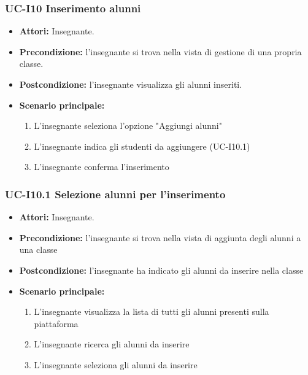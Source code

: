 \subsubsection{UC-I10 Inserimento alunni}
\begin{itemize}
	\item \textbf{Attori:} Insegnante.
	\item \textbf{Precondizione:} l'insegnante si trova nella vista di gestione di una propria classe.
	\item \textbf{Postcondizione:} l'insegnante visualizza gli alunni inseriti.
	\item \textbf{Scenario principale:}
	\begin{enumerate}
		\item L'insegnante seleziona l'opzione "Aggiungi alunni"
		\item L'insegnante indica gli studenti da aggiungere (UC-I10.1)
		\item L'insegnante conferma l'inserimento
	\end{enumerate}
\end{itemize}

\subsubsection{UC-I10.1 Selezione alunni per l'inserimento}
\begin{itemize}
	\item \textbf{Attori:} Insegnante.
	\item \textbf{Precondizione:} l'insegnante si trova nella vista di aggiunta degli alunni a una classe
	\item \textbf{Postcondizione:} l'insegnante ha indicato gli alunni da inserire nella classe
	\item \textbf{Scenario principale:}
	\begin{enumerate}
		\item L'insegnante visualizza la lista di tutti gli alunni presenti sulla piattaforma
		\item L'insegnante ricerca gli alunni da inserire
		\item L'insegnante seleziona gli alunni da inserire
	\end{enumerate}
\end{itemize}

